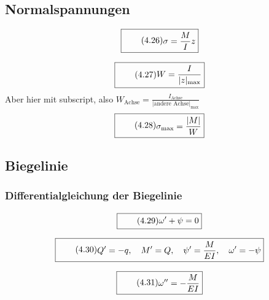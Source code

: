 \documentclass[11pt]{article}
\newcommand{\1}{ {\mathds{1}} }
\newcommand{\abs}[1]{\lvert#1\rvert}
\begin{document}
		\subsection{Normalspannungen}

		\begin{equation}
			\boxed{
				\tag{4.26}
				\begin{split}
					\sigma
					=
					\frac{M}{I}
					z
				\end{split}
			}
		\end{equation}
		
		\begin{equation}
			\boxed{
				\tag{4.27}
				\begin{split}
					W
					=
					\frac{I}{\abs{z}_{\text{max}}}
				\end{split}
			}
		\end{equation}
		Aber hier mit subscript, also $\displaystyle W_{\text{Achse}} = \frac{I_{\text{Achse}}}{\abs{\text{andere Achse}}_{\text{max}}}$
		\begin{equation}
			\boxed{
				\tag{4.28}
				\begin{split}
					\sigma_{\text{max}}
					=
					\frac{\abs{M}}{W}
				\end{split}
			}
		\end{equation}
		
		\subsection{Biegelinie}
		\subsubsection{Differentialgleichung der Biegelinie}

		\begin{equation}
			\boxed{
				\tag{4.29}
				\begin{split}
					\omega' + \psi = 0
				\end{split}
			}
		\end{equation}

		\begin{equation}
			\boxed{
				\tag{4.30}
				\begin{split}
					Q' = -q,\quad M' = Q, \quad \psi' = \frac{M}{E I}, \quad \omega' = -\psi
				\end{split}
			}
		\end{equation}

		\begin{equation}
			\boxed{
				\tag{4.31}
				\begin{split}
					\omega'' = -\frac{M}{E I}
				\end{split}
			}
		\end{equation}
\end{document}
